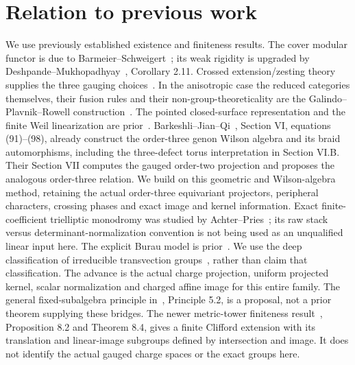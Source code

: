 \documentclass[11pt]{amsart}
\begin{document}
\section{Relation to previous work}
We use previously established existence and finiteness results. The
cover modular functor is due to Barmeier--Schweigert~\cite{BS}; its
weak rigidity is upgraded by Deshpande--Mukhopadhyay~\cite{DM},
Corollary 2.11. Crossed extension/zesting theory supplies the three
gauging choices~\cite{DGP RZ}. In the anisotropic case the reduced
categories themselves, their fusion rules and their non-group-theoreticality
are the Galindo--Plavnik--Rowell construction~\cite{GPR}.
The pointed closed-surface representation and the finite Weil
linearization are prior~\cite{Stirling,GH}.
Barkeshli--Jian--Qi~\cite{BJQ}, Section VI, equations (91)--(98),
already construct the order-three genon Wilson algebra and its braid
automorphisms, including the three-defect torus interpretation in
Section VI.B. Their Section VII computes the gauged order-two projection
and proposes the analogous order-three relation. We build on this
geometric and Wilson-algebra method, retaining the actual order-three
equivariant projectors, peripheral characters, crossing phases and exact
image and kernel information.
Exact finite-coefficient
trielliptic monodromy was studied by Achter--Pries~\cite{AP}; its raw
stack versus determinant-normalization convention is not being used
as an unqualified linear input here. The explicit Burau model is
prior~\cite{Ven}. We use the deep classification of irreducible
transvection groups~\cite{ZS}, rather than claim that classification.
The advance is the actual charge projection, uniform projected
kernel, scalar normalization and charged affine image for this entire
family. The general fixed-subalgebra principle in~\cite{GKRZ},
Principle 5.2, is a proposal, not a prior theorem supplying these bridges.
The newer metric-tower finiteness result~\cite{GR26}, Proposition 8.2
and Theorem 8.4, gives a finite Clifford extension with its translation
and linear-image subgroups defined by intersection and image. It does
not identify the actual gauged charge spaces or the exact groups here.
\end{document}
